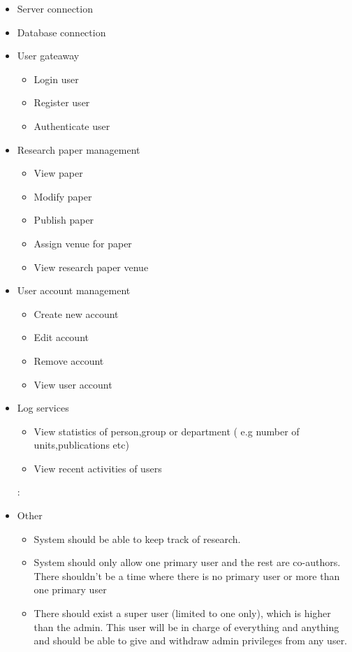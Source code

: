 \documentclass[11pt]{article}
\begin{document}
	\begin{itemize}
		\item Server connection
		\item Database connection
		\item User gateaway
		\begin{itemize}
			\item Login user
			\item Register user
			\item Authenticate user
		\end{itemize}
		\item Research paper management
		\begin{itemize}
			\item View paper
			\item Modify paper
			\item Publish paper
			\item Assign venue for paper
			\item View research paper venue
		\end{itemize}
		\item User account management
		\begin{itemize}
			\item Create new account
			\item Edit account
			\item Remove account
			\item View user account
		\end{itemize}
		\item Log services
		\begin{itemize}
			\item View statistics of person,group or department ( e.g number of units,publications etc)
			\item View recent activities of users
		\end{itemize}:
			\item Other
		\begin{itemize}
			\item System should be able to keep track of research.
		\end{itemize}
		\begin{itemize}
			\item System should only allow one primary user and the rest are co-authors. There shouldn’t be a time where there is no primary user or more than one primary user
		\end{itemize}
		\begin{itemize}
			\item There should exist a super user (limited to one only), which is higher than the admin. This user will be in charge of everything and anything and should be able to give and withdraw admin privileges from any user.
		\end{itemize}
	\end{itemize}
	
\end{document}
